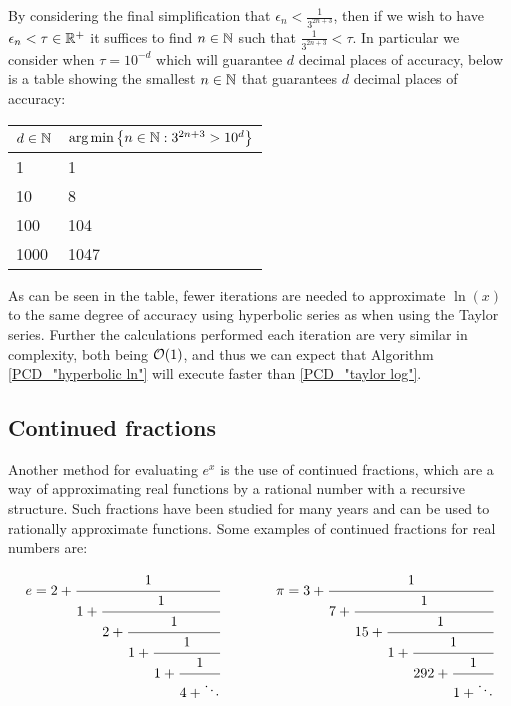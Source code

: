 By considering the final simplification that \(\epsilon_n < \frac{1}{3^{2n+3}}\), then if we wish to have \(\epsilon_n < \tau \in \mathbb{R}^+\) it suffices to find \(n \in \mathbb{N}\) such that \(\frac{1}{3^{2n+3}} < \tau\). In particular we consider when \(\tau = 10^{-d}\) which will guarantee \(d\) decimal places of accuracy, below is a table showing the smallest \(n \in \mathbb{N}\) that guarantees \(d\) decimal places of accuracy:

\begin{center}
\begin{tabular}{|l|l|}
\hline
\(d \in \mathbb{N}\) 
	& \(\textrm{arg}\min\left\{n \in \mathbb{N} : 3^{2n+3} > 10^d\right\}\)\\\hline
1 & 1\\\hline
10 & 8\\\hline
100 & 104\\\hline
1000 & 1047\\\hline
\end{tabular}
\end{center}

As can be seen in the table, fewer iterations are needed to approximate \(\ln(x)\) to the same degree of accuracy using hyperbolic series as when using the Taylor series. Further the calculations performed each iteration are very similar in complexity, both being \(\mathcal{O}(1)\), and thus we can expect that Algorithm \ref{PCD_"hyperbolic ln"} will execute faster than \ref{PCD_"taylor log"}.

\subsection{Continued fractions}

\theoremstyle{plain}
\newtheorem{equiv cont frac}{Proposition}[subsection]
\newtheorem{odd even conv}[equiv cont frac]{Proposition}

Another method for evaluating \(e^x\) is the use of continued fractions, which are a way of approximating real functions by a rational number with a recursive structure. Such fractions have been studied for many years and can be used to rationally approximate functions. Some examples of continued fractions for real numbers are:

\begin{displaymath}
\begin{array}{c@{\hspace{4em}}c}
e = 2 + \cfrac{1}{1 +
	    \cfrac{1}{2 +
		\cfrac{1}{1 +
		\cfrac{1}{1 +
		\cfrac{1}{4 + \ddots} } } } }&
\pi = 3 + \cfrac{1}{7 + 
		  \cfrac{1}{15 +
		  \cfrac{1}{1 + 
		  \cfrac{1}{292 +
		  \cfrac{1}{1 + \ddots} } } } }
\end{array}
\end{displaymath}

